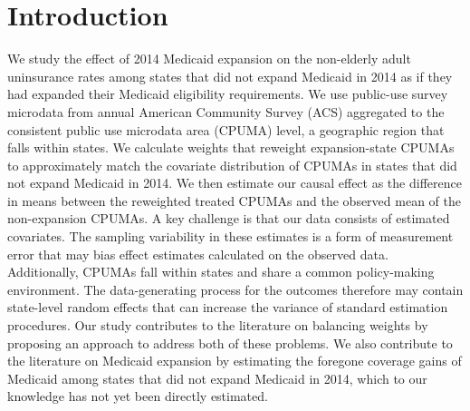 \documentclass[aoas]{imsart}
\theoremstyle{plain}
\theoremstyle{remark}
\begin{document}


\section{Introduction}

We study the effect of 2014 Medicaid expansion on the non-elderly adult uninsurance rates among states that did not expand Medicaid in 2014 as if they had expanded their Medicaid eligibility requirements. We use public-use survey microdata from annual American Community Survey (ACS) aggregated to the consistent public use microdata area (CPUMA) level, a geographic region that falls within states. We calculate weights that reweight expansion-state CPUMAs to approximately match the covariate distribution of CPUMAs in states that did not expand Medicaid in 2014. We then estimate our causal effect as the difference in means between the reweighted treated CPUMAs and the observed mean of the non-expansion CPUMAs. A key challenge is that our data consists of estimated covariates. The sampling variability in these estimates is a form of measurement error that may bias effect estimates calculated on the observed data. Additionally, CPUMAs fall within states and share a common policy-making environment. The data-generating process for the outcomes therefore may contain state-level random effects that can increase the variance of standard estimation procedures. Our study contributes to the literature on balancing weights by proposing an approach to address both of these problems. We also contribute to the literature on Medicaid expansion by estimating the foregone coverage gains of Medicaid among states that did not expand Medicaid in 2014, which to our knowledge has not yet been directly estimated.
\end{document}
